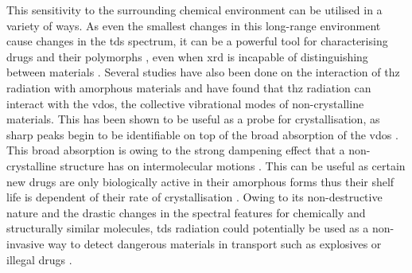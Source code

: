 This sensitivity to the surrounding chemical environment can be utilised in a variety of ways. As even the smallest changes in this long\nobreakdash-range environment cause changes in the \acrshort{tds} spectrum, it can be a powerful tool for characterising drugs and their polymorphs \DIFdelbegin \DIFdel{~}\DIFdelend \cite{Wang2022}, even when \acrfull{xrd} is incapable of distinguishing between materials \DIFdelbegin \DIFdel{~}\DIFdelend \cite{Zeitler2016, Song2021, Druzbicki2015}. Several studies have also been done on the interaction of \acrshort{thz} radiation with amorphous materials and have found that \acrshort{thz} radiation can interact with the \acrfull{vdos}, the collective vibrational modes of non-crystalline materials. This has been shown to be useful as a probe for crystallisation, as sharp peaks begin to be identifiable on top of the broad absorption of the \acrshort{vdos} \DIFdelbegin \DIFdel{~}\DIFdelend \cite{Zeitler2007}. This broad absorption is owing to the strong dampening effect that a non\nobreakdash-crystalline structure has on intermolecular motions \DIFdelbegin \DIFdel{~}\DIFdelend \cite{Walther2003}. This can be useful as certain new drugs are only biologically active in their amorphous forms thus their shelf life is dependent of their rate of crystallisation \DIFdelbegin \DIFdel{~}\DIFdelend \cite{Shmool2019}. Owing to its non\nobreakdash-destructive nature and the drastic changes in the spectral features for chemically and structurally similar molecules, \acrshort{tds} radiation could potentially be used as a non-invasive way to detect dangerous materials in transport such as explosives or illegal drugs \DIFdelbegin \DIFdel{~}\DIFdelend \cite{Davies2008}.
